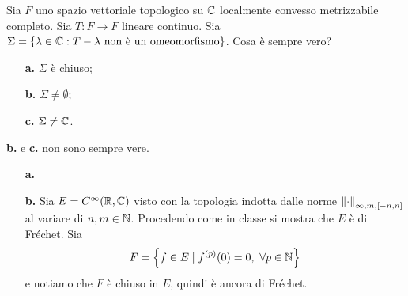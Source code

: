 \documentclass[a4paper]{article}
\newcommand{\normd}{{\norm{\cdot}}}
\begin{document}


\begin{exercise}
Sia $F$ uno spazio vettoriale topologico su $\mathbb{C}$ localmente convesso metrizzabile completo. Sia $T:F\to F$ lineare continuo. Sia $\Sigma=\left\{{\lambda\in\mathbb{C}:T-\lambda\text{ non \`e un omeomorfismo}}\right\}$. Cosa \`e sempre vero?
\begin{enumerate}
    \item [\textbf{a.}]$\Sigma$ \`e chiuso;
    \item[\textbf{b.}] $\Sigma\neq \emptyset$;
    \item[\textbf{c.}] $\Sigma\neq \mathbb{C}$.
\end{enumerate}
\end{exercise}
\begin{solution}
\textbf{b.} e \textbf{c.} non sono sempre vere.
\setlength{\leftmargini}{0cm}
\begin{itemize}
\item[\textbf{a.}] 
\item[\textbf{b.}] Sia $E=C^\infty(\mathbb{R},\mathbb{C})$ visto con la topologia indotta dalle norme $\normd_{\infty, m, [-n,n]}$ al variare di $n,m\in \mathbb{N}$. Procedendo come in classe si mostra che $E$ \`e di Fr\'echet. Sia
\[F=\left\{{f\in E\mid f^{(p)}(0)=0,\ \forall p\in\mathbb{N}}\right\}\]
e notiamo che $F$ \`e chiuso in $E$, quindi \`e ancora di Fr\'echet.


\end{itemize}
\end{solution}
\end{document}
